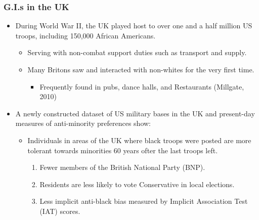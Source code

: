 \documentclass[dvipdfmx,11pt]{beamer}
\begin{document}
\begin{frame}\frametitle{G.I.s in the UK}
  \begin{itemize}
    \item During World War II, the UK played host to over one and a half million US troops, including 150,000 African Americans.
    \begin{itemize}
      \item Serving with non-combat support duties such as transport and supply.
      \item Many Britons saw and interacted with non-whites for the very first time.
      \begin{itemize}
        \item Frequently found in pubs, dance halls, and Restaurants (Millgate, 2010)
      \end{itemize}
    \end{itemize}
    \item A newly constructed dataset of US military bases in the UK and present-day measures of anti-minority preferences show:
    \begin{itemize}
      \item Individuals in areas of the UK where black troops were posted are more tolerant towards minorities 60 years ofter the last troops left.
      \begin{enumerate}
        \item Fewer members of the British National Party (BNP).
        \item Residents are less likely to vote Conservative in local elections.
        \item Less implicit anti-black bias measured by Implicit Association Test (IAT) scores.
      \end{enumerate}
    \end{itemize}
  \end{itemize}
\end{frame}
\end{document}
